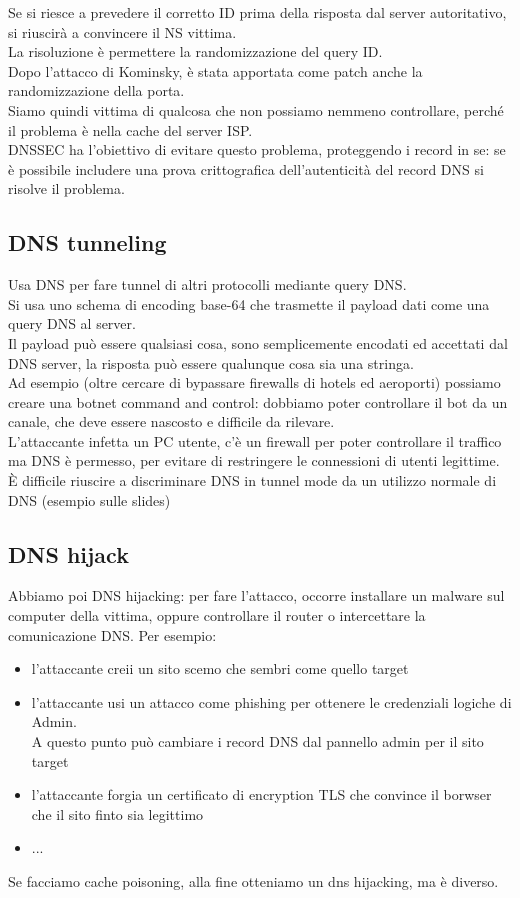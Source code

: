 \documentclass[12pt, oneside]{extbook} %
\begin{document}
Se si riesce a prevedere il corretto ID prima della risposta dal server autoritativo, si riuscirà a convincere il NS vittima.
\\La risoluzione è permettere la randomizzazione del query ID.
\\Dopo l'attacco di Kominsky, è stata apportata come patch anche la randomizzazione della porta.
\\Siamo quindi vittima di qualcosa che non possiamo nemmeno controllare, perché il problema è nella cache del server ISP.
\\DNSSEC ha l'obiettivo di evitare questo problema, proteggendo i record in se: se è possibile includere una prova crittografica dell'autenticità del record DNS si risolve il problema.

\subsection{DNS tunneling}
Usa DNS per fare tunnel di altri protocolli mediante query DNS.
\\Si usa uno schema di encoding base-64 che trasmette il payload dati come una query DNS al server.
\\Il payload può essere qualsiasi cosa, sono semplicemente encodati ed accettati dal DNS server, la risposta può essere qualunque cosa sia una stringa.
\\Ad esempio (oltre cercare di bypassare firewalls di hotels ed aeroporti) possiamo creare una botnet command and control: dobbiamo poter controllare il bot da un canale, che deve essere nascosto e difficile da rilevare.
\\L'attaccante infetta un PC utente, c'è un firewall per poter controllare il traffico ma DNS è permesso, per evitare di restringere le connessioni di utenti legittime.
\\È difficile riuscire a discriminare DNS in tunnel mode da un utilizzo normale di DNS (esempio sulle slides)

\subsection{DNS hijack}
Abbiamo poi DNS hijacking: per fare l'attacco, occorre installare un malware sul computer della vittima, oppure controllare il router o intercettare la comunicazione DNS.
Per esempio:
\begin{itemize}
    \item l'attaccante creii un sito scemo che sembri come quello target
    \item l'attaccante usi un attacco come phishing per ottenere le credenziali logiche di Admin.
    \\A questo punto può cambiare i record DNS dal pannello admin per il sito target
    \item l'attaccante forgia un certificato di encryption TLS che convince il borwser che il sito finto sia legittimo
    \item ...
\end{itemize}
Se facciamo cache poisoning, alla fine otteniamo un dns hijacking, ma è diverso.
\end{document}
